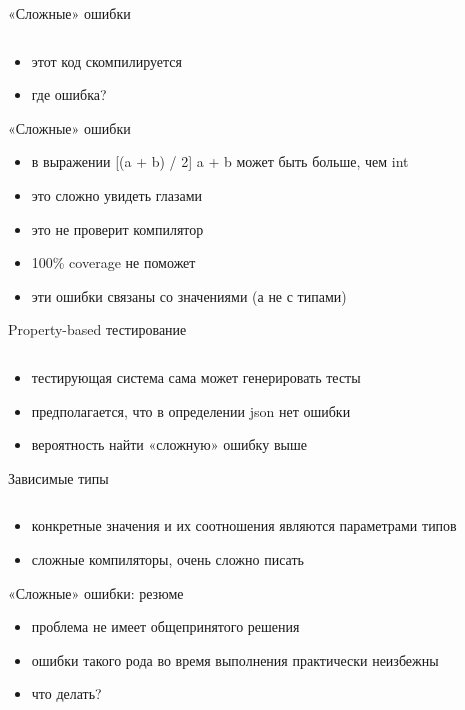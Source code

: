 \documentclass[10pt]{beamer}
\newcommand{\code}[4]{\inputminted[linenos, frame=none, firstline=#2, lastline=#3,
  framesep=10pt, bgcolor=lightgray]{#4}{#1}}
\begin{document}
\begin{frame}{«Сложные» ошибки}
  \code{code.java}{9}{15}{java}
  \begin{itemize}
  \item этот код скомпилируется
  \item где ошибка?
  \end{itemize}
\end{frame}

\begin{frame}{«Сложные» ошибки}
  \begin{itemize}
  \item в выражении [(a + b) / 2] a + b может быть больше, чем int
  \item это сложно увидеть глазами
  \item это не проверит компилятор
  \item 100\% coverage не поможет
  \item эти ошибки связаны со значениями (а не с типами)
  \end{itemize}
\end{frame}

\begin{frame}{Property-based тестирование}
  \code{code.erl}{13}{15}{erlang}
  \begin{itemize}
  \item тестирующая система сама может генерировать тесты
  \item предполагается, что в определении json нет ошибки
  \item вероятность найти «сложную» ошибку выше
  \end{itemize}
\end{frame}

\begin{frame}{Зависимые типы}
  \code{code.ats}{1}{3}{c}
  \begin{itemize}
  \item конкретные значения и их соотношения являются параметрами типов
  \item сложные компиляторы, очень сложно писать
  \end{itemize}
\end{frame}

\begin{frame}{«Сложные» ошибки: резюме}
  \begin{itemize}
  \item проблема не имеет общепринятого решения
  \item ошибки такого рода во время выполнения практически неизбежны
  \item что делать?
  \end{itemize}
\end{frame}
\end{document}
